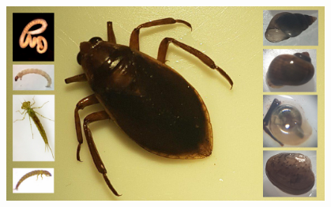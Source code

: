 \documentclass[final]{beamer}
\newlength{\sepmargin}
\newlength{\onecolwid}
\begin{document}
\begin{frame}[t]
\begin{columns}[t]
\begin{column}{\onecolwid}
\begin{block}{ }
                
                \begin{figure}
                    \includegraphics[width=0.95\linewidth]{popu.jpg}
				\end{figure}
                
		\end{block}
      \end{column}
      
      \begin{column}{\sepmargin} \end{column}
      \end{columns} 
       
      \begin{columns}[t] %
      

\end{columns}
\end{frame}
\end{document}

